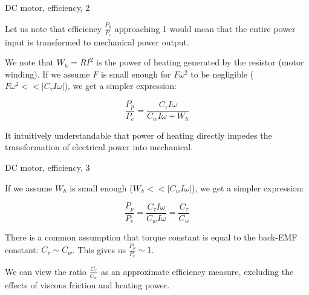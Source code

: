 \documentclass{beamer}
\begin{document}
\begin{frame}{DC motor, efficiency, 2}
	\begin{flushleft}
		
		Let us note that efficiency $\frac{P_p}{P_e}$ approaching 1 would mean that the entire power input is transformed to mechanical power output.
		
		\bigskip
		
		We note that $W_h = RI^2$ is the power of heating generated by the resistor (motor winding).  If we assume $F$ is small enough for $F \omega^2$ to be negligible ($F \omega^2 << |C_\tau I\omega|$), we get a simpler expression:
		
		\begin{equation}
			\frac{P_p}{P_e} = \frac{C_\tau I\omega}{C_w I\omega + W_h}
		\end{equation}
		
		It intuitively understandable that power of heating directly impedes the transformation of electrical power into mechanical.
		
		
	\end{flushleft}
\end{frame}



\begin{frame}{DC motor, efficiency, 3}
	\begin{flushleft}
		
		 If we assume $W_h$ is small enough ($W_h << |C_w I\omega|$), we get a simpler expression:
		
		\begin{equation}
			\frac{P_p}{P_e} = \frac{C_\tau I\omega}{C_w I\omega} = \frac{C_\tau}{C_w}
		\end{equation}
		
		There is a common assumption that torque constant  is equal to the back-EMF constant: $C_\tau \sim C_w$. This gives us $\frac{P_p}{P_e} \sim 1$. 
		
		\bigskip
		
		We can view the ratio $\frac{C_\tau}{C_w}$ as an approximate efficiency measure, excluding the effects of viscous friction and heating power.
		
		
	\end{flushleft}
\end{frame}
\end{document}
